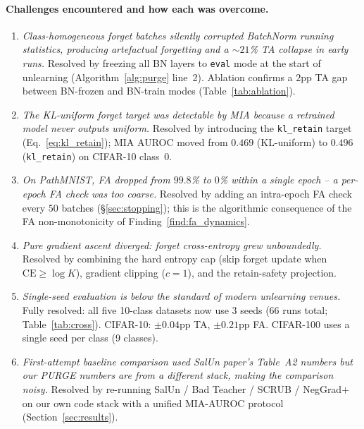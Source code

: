 \documentclass{article}
\newcommand{\klr}{\texttt{kl\_retain}}
\newcommand{\CE}{\mathrm{CE}}
\newcommand{\new}[1]{{\color{orange}#1}}
\begin{document}
{\paragraph{Challenges encountered and how each was overcome.}
\begin{enumerate}[nosep,leftmargin=*]
\item \textit{Class-homogeneous forget batches silently corrupted BatchNorm running statistics, producing artefactual forgetting and a $\sim 21$\% TA collapse in early runs.} Resolved by freezing all BN layers to \texttt{eval} mode at the start of unlearning (Algorithm~\ref{alg:purge} line~2). Ablation confirms a $2$pp TA gap between BN-frozen and BN-train modes (Table~\ref{tab:ablation}).
\item \textit{The KL-uniform forget target was detectable by MIA because a retrained model never outputs uniform.} Resolved by introducing the \klr{} target (Eq.~\ref{eq:kl_retain}); MIA AUROC moved from $0.469$ (KL-uniform) to $0.496$ (\klr{}) on CIFAR-10 class~0.
\item \textit{On PathMNIST, FA dropped from $99.8$\% to $0$\% within a single epoch -- a per-epoch FA check was too coarse.} Resolved by adding an intra-epoch FA check every $50$ batches (\S\ref{sec:stopping}); this is the algorithmic consequence of the FA non-monotonicity of Finding~\ref{find:fa_dynamics}.
\item \textit{Pure gradient ascent diverged: forget cross-entropy grew unboundedly.} Resolved by combining the hard entropy cap (skip forget update when $\CE \ge \log K$), gradient clipping ($c=1$), and the retain-safety projection.
\item \textit{Single-seed evaluation is below the standard of modern unlearning venues.} \new{Fully resolved: all five 10-class datasets now use 3 seeds (66 runs total; Table~\ref{tab:cross}). CIFAR-10: $\pm 0.04$pp TA, $\pm 0.21$pp FA. CIFAR-100 uses a single seed per class (9 classes).}
\item \textit{First-attempt baseline comparison used SalUn paper's Table~A2 numbers but our PURGE numbers are from a different stack, making the comparison noisy.} Resolved by re-running SalUn / Bad Teacher / SCRUB / NegGrad+ on our own code stack with a unified MIA-AUROC protocol (Section~\ref{sec:results}).
\end{enumerate}

}
\end{document}
